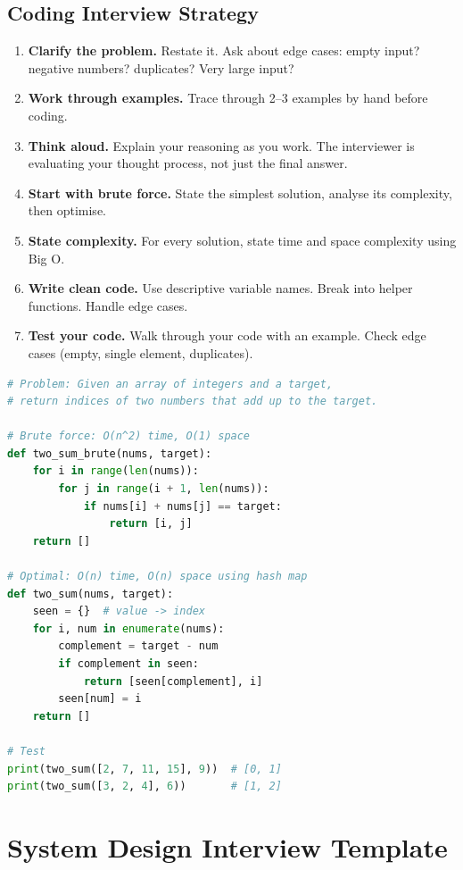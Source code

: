 \documentclass[12pt, a4paper, oneside]{book}
\begin{document}
\subsection{Coding Interview Strategy}

\begin{enumerate}[leftmargin=2em]
    \item \textbf{Clarify the problem.} Restate it. Ask about edge cases: empty input? negative numbers? duplicates? Very large input?
    \item \textbf{Work through examples.} Trace through 2--3 examples by hand before coding.
    \item \textbf{Think aloud.} Explain your reasoning as you work. The interviewer is evaluating your thought process, not just the final answer.
    \item \textbf{Start with brute force.} State the simplest solution, analyse its complexity, then optimise.
    \item \textbf{State complexity.} For every solution, state time and space complexity using Big O.
    \item \textbf{Write clean code.} Use descriptive variable names. Break into helper functions. Handle edge cases.
    \item \textbf{Test your code.} Walk through your code with an example. Check edge cases (empty, single element, duplicates).
\end{enumerate}

\begin{lstlisting}[language=Python, caption={Example: Two Sum (LeetCode \#1)}]
# Problem: Given an array of integers and a target,
# return indices of two numbers that add up to the target.

# Brute force: O(n^2) time, O(1) space
def two_sum_brute(nums, target):
    for i in range(len(nums)):
        for j in range(i + 1, len(nums)):
            if nums[i] + nums[j] == target:
                return [i, j]
    return []

# Optimal: O(n) time, O(n) space using hash map
def two_sum(nums, target):
    seen = {}  # value -> index
    for i, num in enumerate(nums):
        complement = target - num
        if complement in seen:
            return [seen[complement], i]
        seen[num] = i
    return []

# Test
print(two_sum([2, 7, 11, 15], 9))  # [0, 1]
print(two_sum([3, 2, 4], 6))       # [1, 2]
\end{lstlisting}

\section{System Design Interview Template}
\end{document}
